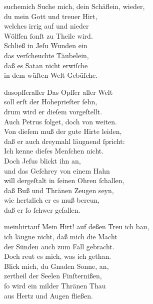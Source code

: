 \documentclass[tocstyle=ref-genre]{ees}
\begin{document}
{\begin{movement}{suchemich}
  \voice[Coro]
  Suche mich, dein Schäflein, wieder,\\
  du mein Gott und treuer Hirt,\\
  welches irrig auf und nieder\\
  Wölffen ſonſt zu Theile wird.\\
  Schließ in Jeſu Wunden ein\\
  das verſcheuchte Täubelein,\\
  daß es Satan nicht erwiſche\\
  in dem wüſten Welt Gebüſche.
\end{movement}

\begin{movement}{dasopfferaller}
  Das Opffer aller Welt\\
  soll erſt der Hoheprieſter ſehn,\\
  drum wird er dieſem vorgeſtellt.\\
  Auch Petrus folget, doch von weiten.\\
  Von dieſem muß der gute Hirte leiden,\\
  daß er auch dreymahl läugnend ſpricht:\\
  Ich kenne dieſes Menſchen nicht.\\
  Doch Jeſus blickt ihn an,\\
  und das Geſchrey von einem Hahn\\
  will dergeſtalt in ſeinen Ohren ſchallen,\\
  daß Buß und Thränen Zeugen seyn,\\
  wie hertzlich er es muß bereun,\\
  daß er ſo ſchwer gefallen.
\end{movement}

\begin{movement}{meinhirtauf}
  Mein Hirt! auf deßen Treu ich bau,\\
  ich läugne nicht, daß mich die Macht\\
  der Sünden auch zum Fall gebracht.\\
  Doch reut es mich, was ich gethan.\\
  Blick mich, du Gnaden Sonne, an,\\
  zertheil der Seelen Finſternißen,\\
  ſo wird ein milder Thränen Thau\\
  aus Hertz und Augen fließen.
\end{movement}

}
\end{document}
